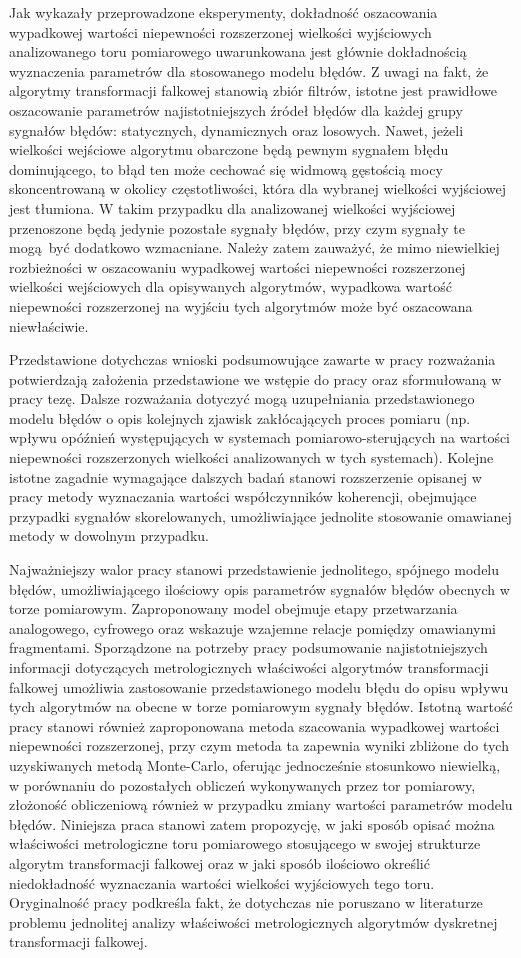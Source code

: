 Jak wykazały przeprowadzone eksperymenty, dokładność oszacowania wypadkowej wartości niepewności rozszerzonej wielkości wyjściowych analizowanego toru pomiarowego uwarunkowana jest głównie dokładnością wyznaczenia parametrów dla stosowanego modelu błędów. Z uwagi na fakt, że algorytmy transformacji falkowej stanowią zbiór filtrów, istotne jest prawidłowe oszacowanie parametrów najistotniejszych źródeł błędów dla każdej grupy sygnałów błędów: statycznych, dynamicznych oraz losowych. Nawet, jeżeli wielkości wejściowe algorytmu obarczone będą pewnym sygnałem błędu dominującego, to błąd ten może cechować się widmową gęstością mocy skoncentrowaną w okolicy częstotliwości, która dla wybranej wielkości wyjściowej jest tłumiona. W takim przypadku dla analizowanej wielkości wyjściowej przenoszone będą jedynie pozostałe sygnały błędów, przy czym sygnały te mogą być dodatkowo wzmacniane. Należy zatem zauważyć, że mimo niewielkiej rozbieżności w oszacowaniu wypadkowej wartości niepewności rozszerzonej wielkości wejściowych dla opisywanych algorytmów, wypadkowa wartość niepewności rozszerzonej na wyjściu tych algorytmów może być oszacowana niewłaściwie.

Przedstawione dotychczas wnioski podsumowujące zawarte w pracy rozważania potwierdzają założenia przedstawione we wstępie do pracy oraz sformułowaną w pracy tezę. Dalsze rozważania dotyczyć mogą uzupełniania przedstawionego modelu błędów o opis kolejnych zjawisk zakłócających proces pomiaru (np. wpływu opóźnień występujących w systemach pomiarowo-sterujących na wartości niepewności rozszerzonych wielkości analizowanych w tych systemach). Kolejne istotne zagadnie wymagające dalszych badań stanowi rozszerzenie opisanej w pracy metody wyznaczania wartości współczynników koherencji, obejmujące przypadki sygnałów skorelowanych, umożliwiające jednolite stosowanie omawianej metody w dowolnym przypadku.

Najważniejszy walor pracy stanowi przedstawienie jednolitego, spójnego modelu błędów, umożliwiającego ilościowy opis parametrów sygnałów błędów obecnych w torze pomiarowym. Zaproponowany model obejmuje etapy przetwarzania analogowego, cyfrowego oraz wskazuje wzajemne relacje pomiędzy omawianymi fragmentami. Sporządzone na potrzeby pracy podsumowanie najistotniejszych informacji dotyczących metrologicznych właściwości algorytmów transformacji falkowej umożliwia zastosowanie przedstawionego modelu błędu do opisu wpływu tych algorytmów na obecne w torze pomiarowym sygnały błędów. Istotną wartość pracy stanowi również zaproponowana metoda szacowania wypadkowej wartości niepewności rozszerzonej, przy czym metoda ta zapewnia wyniki zbliżone do tych uzyskiwanych metodą Monte-Carlo, oferując jednocześnie stosunkowo niewielką, w porównaniu do pozostałych obliczeń wykonywanych przez tor pomiarowy, złożoność obliczeniową również w przypadku zmiany wartości parametrów modelu błędów. Niniejsza praca stanowi zatem propozycję, w jaki sposób opisać można właściwości metrologiczne toru pomiarowego stosującego w swojej strukturze algorytm transformacji falkowej oraz w jaki sposób ilościowo określić niedokładność wyznaczania wartości wielkości wyjściowych tego toru. Oryginalność pracy podkreśla fakt, że dotychczas nie poruszano w literaturze problemu jednolitej analizy właściwości metrologicznych algorytmów dyskretnej transformacji falkowej.
